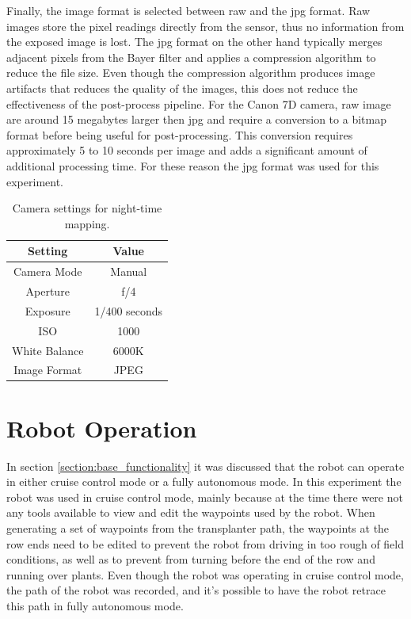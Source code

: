 Finally, the image format is selected between raw and the \ac{jpg} format.  Raw images store the pixel readings directly from the sensor, thus no information from the exposed image is lost.  The \ac{jpg} format on the other hand typically merges adjacent pixels from the Bayer filter and applies a compression algorithm to reduce the file size.  Even though the compression algorithm produces image artifacts that reduces the quality of the images, this does not reduce the effectiveness of the post-process pipeline.  For the Canon 7D camera, raw image are around 15 megabytes larger then \ac{jpg} and require a conversion to a bitmap format before being useful for post-processing.  This conversion requires approximately 5 to 10 seconds per image and adds a significant amount of additional processing time.  For these reason the \ac{jpg} format was used for this experiment.

\begin{table}
    \begin{center}
    \caption[Camera settings]{Camera settings for night-time mapping.}
    \begin{tabular}[c]{|c|c|}
        \hline
        Setting & Value \\
        \hline
        Camera Mode     & Manual        \\
        Aperture & f/4          \\
        Exposure & 1/400 seconds   \\
        ISO      & 1000  \\
        White Balance & 6000K \\
        Image Format & JPEG \\
        \hline
    \end{tabular}
    \label{table:camera_settings}
   \end{center}
\end{table}


\section{Robot Operation}

In section \ref{section:base_functionality} it was discussed that the robot can operate in either cruise control mode or a fully autonomous mode.  In this experiment the robot was used in cruise control mode, mainly because at the time there were not any tools available to view and edit the waypoints used by the robot.  When generating a set of waypoints from the transplanter path, the waypoints at the row ends need to be edited to prevent the robot from driving in too rough of field conditions, as well as to prevent from turning before the end of the row and running over plants.  Even though the robot was operating in cruise control mode, the path of the robot was recorded, and it's possible to have the robot retrace this path in fully autonomous mode.
